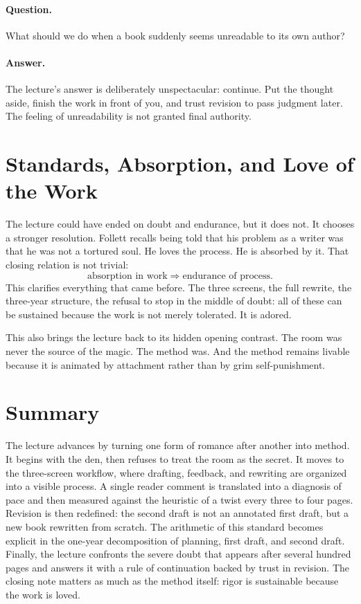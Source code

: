 \paragraph{Question.} What should we do when a book suddenly seems unreadable to its own author?

\paragraph{Answer.} The lecture's answer is deliberately unspectacular: continue. Put the thought aside, finish the work in front of you, and trust revision to pass judgment later. The feeling of unreadability is not granted final authority.

\section{Standards, Absorption, and Love of the Work}

The lecture could have ended on doubt and endurance, but it does not. It chooses a stronger resolution. Follett recalls being told that his problem as a writer was that he was not a tortured soul. He loves the process. He is absorbed by it. That closing relation is not trivial:
\begin{equation}
\text{absorption in work} \Rightarrow \text{endurance of process}.
\end{equation}
This clarifies everything that came before. The three screens, the full rewrite, the three-year structure, the refusal to stop in the middle of doubt: all of these can be sustained because the work is not merely tolerated. It is adored.

This also brings the lecture back to its hidden opening contrast. The room was never the source of the magic. The method was. And the method remains livable because it is animated by attachment rather than by grim self-punishment.

\section{Summary}

The lecture advances by turning one form of romance after another into method. It begins with the den, then refuses to treat the room as the secret. It moves to the three-screen workflow, where drafting, feedback, and rewriting are organized into a visible process. A single reader comment is translated into a diagnosis of pace and then measured against the heuristic of a twist every three to four pages. Revision is then redefined: the second draft is not an annotated first draft, but a new book rewritten from scratch. The arithmetic of this standard becomes explicit in the one-year decomposition of planning, first draft, and second draft. Finally, the lecture confronts the severe doubt that appears after several hundred pages and answers it with a rule of continuation backed by trust in revision. The closing note matters as much as the method itself: rigor is sustainable because the work is loved.